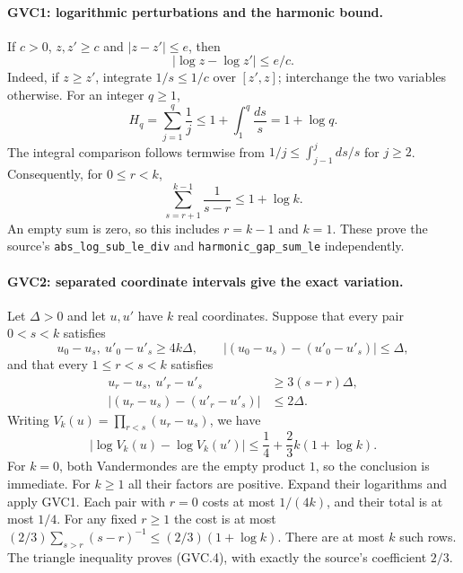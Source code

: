 \paragraph{GVC1: logarithmic perturbations and the harmonic bound.}
\label{claim:GVC1}
If $c>0$, $z,z'\ge c$ and $|z-z'|\le e$, then
\[
                  |\log z-\log z'|\le e/c.                 \tag{GVC.2}
\]
Indeed, if $z\ge z'$, integrate $1/s\le1/c$ over
$[z',z]$; interchange the two variables otherwise.
For an integer $q\ge1$,
\[
 H_q=\sum_{j=1}^{q}\frac1j
 \le1+\int_1^q\frac{ds}{s}=1+\log q.
\]
The integral comparison follows termwise from
$1/j\le\int_{j-1}^j ds/s$ for $j\ge2$.
Consequently, for $0\le r<k$,
\[
                  \sum_{s=r+1}^{k-1}\frac1{s-r}
                         \le1+\log k.                     \tag{GVC.3}
\]
An empty sum is zero, so this includes $r=k-1$ and $k=1$.
These prove the source's \texttt{abs\_log\_sub\_le\_div}
and \texttt{harmonic\_gap\_sum\_le} independently.

\paragraph{GVC2: separated coordinate intervals give the exact variation.}
\label{claim:GVC2}
Let $\Delta>0$ and let $u,u'$ have $k$ real coordinates. Suppose
that every pair $0<s<k$ satisfies
\[
 u_0-u_s,\ u'_0-u'_s\ge4k\Delta,\qquad
 |(u_0-u_s)-(u'_0-u'_s)|\le\Delta,
\]
and that every $1\le r<s<k$ satisfies
\[
 \begin{split}
 u_r-u_s,\ u'_r-u'_s&\ge3(s-r)\Delta,\\
 |(u_r-u_s)-(u'_r-u'_s)|&\le2\Delta.
 \end{split}
\]
Writing $V_k(u)=\prod_{r<s}(u_r-u_s)$, we have
\[
 \boxed{\quad
 |\log V_k(u)-\log V_k(u')|
 \le\frac14+\frac23 k(1+\log k).
 \quad}                                                     \tag{GVC.4}
\]
For $k=0$, both Vandermondes are the empty product $1$,
so the conclusion is immediate. For $k\ge1$ all their factors
are positive. Expand their logarithms and apply GVC1.
Each pair with $r=0$ costs at most $1/(4k)$, and their total is
at most $1/4$. For any fixed $r\ge1$ the cost is at most
$(2/3)\sum_{s>r}(s-r)^{-1}\le(2/3)(1+\log k)$.
There are at most $k$ such rows. The triangle inequality proves
(GVC.4), with exactly the source's coefficient $2/3$.

